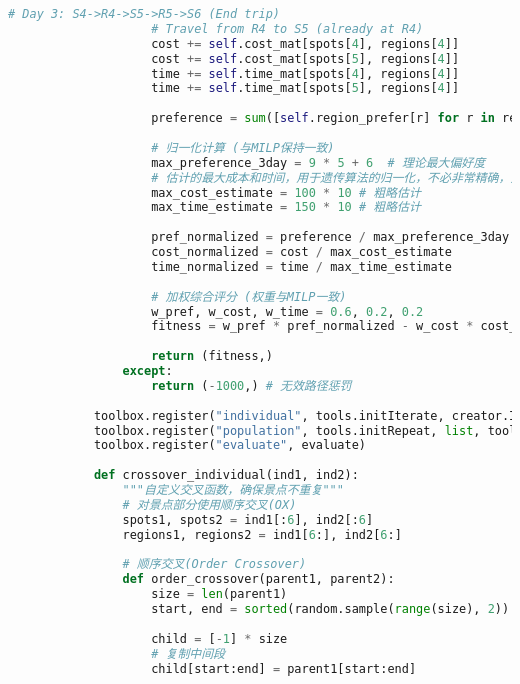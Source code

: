 \begin{lstlisting}[language=Python]
                    # Day 3: S4->R4->S5->R5->S6 (End trip)
                    # Travel from R4 to S5 (already at R4)
                    cost += self.cost_mat[spots[4], regions[4]]
                    cost += self.cost_mat[spots[5], regions[4]]
                    time += self.time_mat[spots[4], regions[4]]
                    time += self.time_mat[spots[5], regions[4]]
    
                    preference = sum([self.region_prefer[r] for r in regions]) + 6 # 6 unique spots contribute to base preference
                    
                    # 归一化计算 (与MILP保持一致)
                    max_preference_3day = 9 * 5 + 6  # 理论最大偏好度
                    # 估计的最大成本和时间，用于遗传算法的归一化，不必非常精确，只要能大致区分好坏
                    max_cost_estimate = 100 * 10 # 粗略估计
                    max_time_estimate = 150 * 10 # 粗略估计
                    
                    pref_normalized = preference / max_preference_3day
                    cost_normalized = cost / max_cost_estimate
                    time_normalized = time / max_time_estimate
                    
                    # 加权综合评分 (权重与MILP一致)
                    w_pref, w_cost, w_time = 0.6, 0.2, 0.2
                    fitness = w_pref * pref_normalized - w_cost * cost_normalized - w_time * time_normalized
                    
                    return (fitness,)
                except:
                    return (-1000,) # 无效路径惩罚
            
            toolbox.register("individual", tools.initIterate, creator.Individual, create_individual)
            toolbox.register("population", tools.initRepeat, list, toolbox.individual)
            toolbox.register("evaluate", evaluate)
            
            def crossover_individual(ind1, ind2):
                """自定义交叉函数，确保景点不重复"""
                # 对景点部分使用顺序交叉(OX)
                spots1, spots2 = ind1[:6], ind2[:6]
                regions1, regions2 = ind1[6:], ind2[6:]
                
                # 顺序交叉(Order Crossover)
                def order_crossover(parent1, parent2):
                    size = len(parent1)
                    start, end = sorted(random.sample(range(size), 2))
                    
                    child = [-1] * size
                    # 复制中间段
                    child[start:end] = parent1[start:end]
                    

\end{lstlisting}
